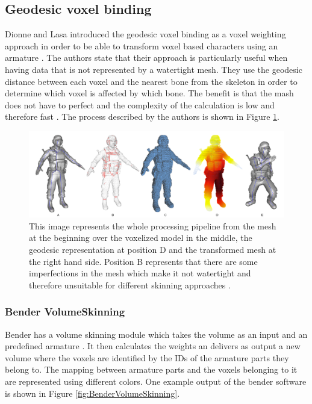 \subsection{Geodesic voxel binding}

Dionne and Lasa introduced the geodesic voxel binding as a voxel weighting approach in order to be able to transform voxel based characters using an armature \cite{Dionne2013GeodesicMeshes}. The authors state that their approach is particularly useful when having data that is not represented by a watertight mesh. They use the geodesic distance between each voxel and the nearest bone from the skeleton in order to determine which voxel is affected by which bone. The benefit is that the mash does not have to perfect and the complexity of the calculation is low and therefore fast \cite{Dionne2013GeodesicMeshes}. The process described by the authors is shown in Figure \ref{fig:geodesic}.

\begin{figure} [htb!]
    \centering
	\includegraphics[width=13cm]{content/images/geodesic}
	\caption{This image represents the whole processing pipeline from the mesh at the beginning over the voxelized model in the middle, the geodesic representation at position D and the transformed mesh at the right hand side. Position B represents that there are some imperfections in the mesh which make it not watertight and therefore unsuitable for different skinning approaches \cite{Dionne2013GeodesicMeshes}.} 
	\label{fig:geodesic}
\end{figure}

\newpage

\subsubsection{Bender VolumeSkinning}

Bender has a volume skinning module which takes the volume as an input and an predefined armature \cite{Finet2014Bender:Morphing}. It then calculates the weights an delivers as output a new volume where the voxels are identified by the IDs of the armature parts they belong to. The mapping between armature parts and the voxels belonging to it are represented using different colors. One example output of the bender software is shown in Figure \ref{fig:BenderVolumeSkinning}.

